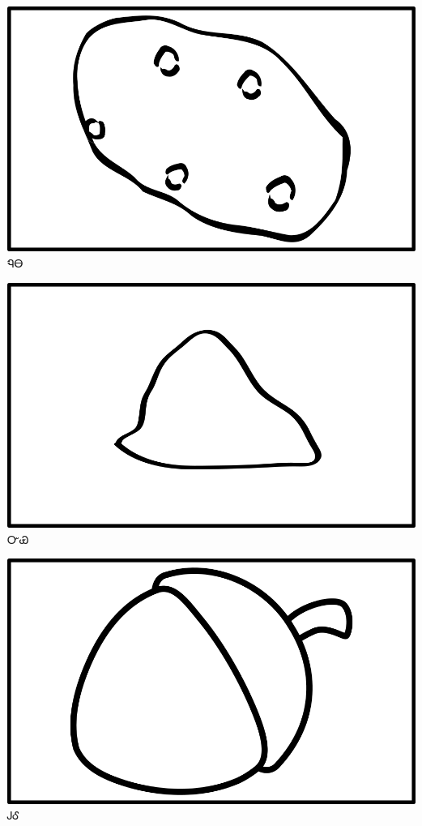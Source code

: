 \documentclass[avery5371]{flashcards}%
\begin{document}

    \begin{flashcard}{
        \includegraphics[width=0.95\columnwidth,height=.51\columnwidth,keepaspectratio]{../artwork/objects-neutral/nuna}
    }
        \Huge ᏄᎾ
    \end{flashcard}

    \begin{flashcard}{
        \includegraphics[width=0.95\columnwidth,height=.51\columnwidth,keepaspectratio]{../artwork/objects-neutral/nvya}
    }
        \Huge ᏅᏯ
    \end{flashcard}

    \begin{flashcard}{
        \includegraphics[width=0.95\columnwidth,height=.51\columnwidth,keepaspectratio]{../artwork/objects-neutral/gule}
    }
        \Huge ᎫᎴ
    \end{flashcard}
\end{document}
